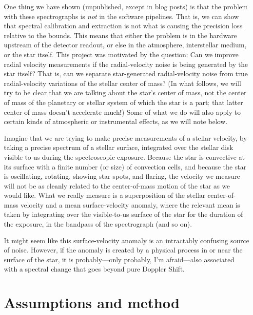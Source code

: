 \documentclass[12pt, letterpaper]{article}
\begin{document}
One thing we have shown (unpublished, except in blog posts) is that
the problem with these spectrographs is \emph{not} in the software
pipelines.
That is, we can show that spectral calibration and extraction is not
what is causing the precision loss relative to the bounds.
This means that either the problem is in the hardware upstream of the
detector readout, or else in the atmosphere, interstellar medium, or
the star itself.
This project was motivated by the question: Can we improve radial
velocity measurements if the radial-velocity noise is being generated
by the star itself?
That is, can we separate star-generated radial-velocity noise from
true radial-velocity variations of the stellar center of mass?
(In what follows, we will try to be clear that we are talking about
the star's center of mass, not the center of mass of the planetary or
stellar system of which the star is a part; that latter center of mass
doesn't accelerate much!)
Some of what we do will also apply to certain kinds of atmospheric or
instrumental effects, as we will note below.

Imagine that we are trying to make precise measurements of a stellar
velocity, by taking a precise spectrum of a stellar surface,
integrated over the stellar disk visible to us during the
spectroscopic exposure.
Because the star is convective at its surface with a finite number (or
size) of convection cells, and because the star is oscillating,
rotating, showing star spots, and flaring, the velocity we measure
will not be as cleanly related to the center-of-mass motion of the
star as we would like.
What we really measure is a superposition of the stellar
center-of-mass velocity and a mean surface-velocity anomaly, where the
relevant mean is taken by integrating over the visible-to-us surface
of the star for the duration of the exposure, in the bandpass of the
spectrograph (and so on).

It might seem like this surface-velocity anomaly is an intractably
confusing source of noise.
However, if the anomaly is created by a physical process in or near
the surface of the star, it is probably---only probably, I'm
afraid---also associated with a spectral change that goes beyond pure
Doppler Shift.

\section{Assumptions and method}
\end{document}
